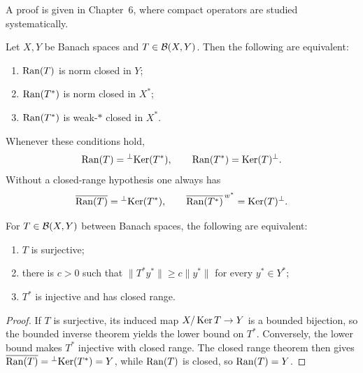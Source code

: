 \begin{noteremark}
A proof is given in Chapter~6, where compact operators are studied
systematically.
\end{noteremark}

\begin{notetheorem}
Let $X,Y$ be Banach spaces and $T\in\mathcal{B}(X,Y)$.  Then the following are
equivalent:
\begin{enumerate}
  \item $\operatorname{Ran}(T)$ is norm closed in $Y$;
  \item $\operatorname{Ran}(T^*)$ is norm closed in $X^*$;
  \item $\operatorname{Ran}(T^*)$ is weak-$*$ closed in $X^*$.
\end{enumerate}
Whenever these conditions hold,
\[
  \operatorname{Ran}(T)={}^{\perp}\!\operatorname{Ker}(T^*),
  \qquad
  \operatorname{Ran}(T^*)=\operatorname{Ker}(T)^{\perp}.
\]
Without a closed-range hypothesis one always has
\[
  \overline{\operatorname{Ran}(T)}={}^{\perp}\!\operatorname{Ker}(T^*),
  \qquad
  \overline{\operatorname{Ran}(T^*)}^{\,w^*}=\operatorname{Ker}(T)^{\perp}.
\]
\end{notetheorem}

\begin{notecorollary}
For $T\in\mathcal{B}(X,Y)$ between Banach spaces, the following are equivalent:
\begin{enumerate}
  \item $T$ is surjective;
  \item there is $c>0$ such that $\|T^*y^*\|\ge c\|y^*\|$ for every
        $y^*\in Y^*$;
  \item $T^*$ is injective and has closed range.
\end{enumerate}
\end{notecorollary}

\begin{proof}
If $T$ is surjective, its induced map $X/\operatorname{Ker} T\to Y$ is a bounded bijection,
so the bounded inverse theorem yields the lower bound on $T^*$.  Conversely,
the lower bound makes $T^*$ injective with closed range.  The closed range
theorem then gives
$\overline{\operatorname{Ran}(T)}={}^{\perp}\!\operatorname{Ker}(T^*)=Y$, while $\operatorname{Ran}(T)$ is closed, so
$\operatorname{Ran}(T)=Y$.
\end{proof}

